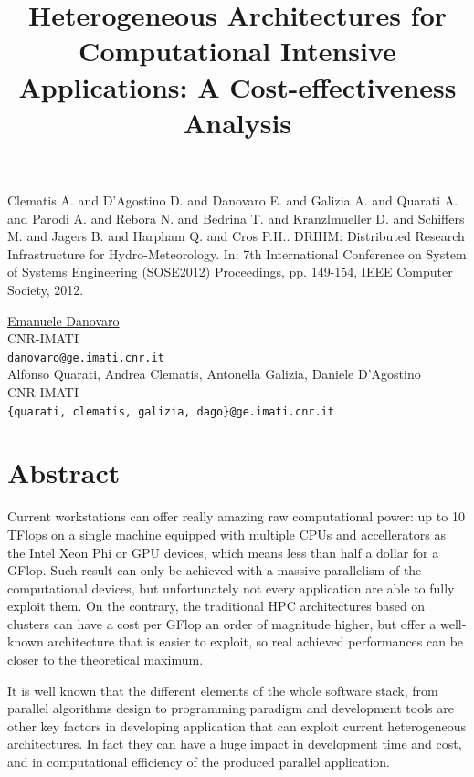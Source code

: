 \documentclass[article, A4, 11pt]{llncs}%
\begin{document}

\begin{thebibliography}{10}
{\sc Clematis A. and D'Agostino D. and Danovaro E. and Galizia A. and Quarati A. and Parodi A. and Rebora N. and Bedrina T. and Kranzlmueller D. and Schiffers M. and Jagers B. and Harpham Q. and Cros P.H.}. {DRIHM: Distributed Research Infrastructure for Hydro-Meteorology}. In: 7th International Conference on System of Systems Engineering (SOSE2012) Proceedings, pp. 149-154, IEEE Computer Society, 2012.
\end{thebibliography} %

\title{Heterogeneous Architectures for Computational Intensive Applications: A Cost-effectiveness Analysis}
 \author{} \institute{}
\maketitle
\begin{center}
{\large \underline{Emanuele Danovaro}}\\
CNR-IMATI\\
{\tt danovaro@ge.imati.cnr.it}
\\ \vspace{4mm}
{\large Alfonso Quarati, Andrea Clematis, Antonella Galizia, Daniele D'Agostino}\\
CNR-IMATI\\
{\tt \{quarati, clematis, galizia, dago\}@ge.imati.cnr.it}
\end{center}

\section*{Abstract}
Current workstations can offer really amazing raw computational power: up to 10 TFlops on a single machine equipped with multiple CPUs and accellerators as the Intel Xeon Phi or GPU devices, which means less than half a dollar for a GFlop. Such result can only be achieved with a massive parallelism of the computational devices, but unfortunately not every application are able to fully exploit them. On the contrary, the traditional HPC architectures based on clusters can have a cost per GFlop an order of magnitude higher, but offer a well-known architecture that is easier to exploit, so real achieved performances can be closer to the theoretical maximum.

It is well known that the different elements of the whole software stack, from parallel algorithms design to programming paradigm and development tools are other key factors in developing application that can exploit current heterogeneous architectures. In fact they can have a huge impact in development time and cost, and in computational efficiency of the produced parallel application.
\end{document}
